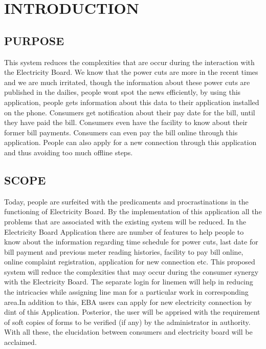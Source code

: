 \documentclass[12pt,a4paper,oneside]{report}
\begin{document}
\chapter{INTRODUCTION}
\label{intro}
\setcounter{page}{1}
\section{PURPOSE}
\par 
This system reduces the complexities that are occur during the interaction with the Electricity
Board. We know that the power cuts are more in the recent times and we are much
irritated, though the information about these power cuts are published in the dailies, people
wont spot the news efficiently, by using this application, people gets information about this
data to their application installed on the phone. Consumers get notification about their pay date
for the bill, until they have paid the bill. Consumers even have the facility to know about their
former bill payments. Consumers can even pay the bill online through this application. People
can also apply for a new connection through this application and thus avoiding too much offline
steps.

\section{SCOPE}
\par Today, people are surfeited with the predicaments and procrastinations in the functioning
of Electricity Board. By the implementation of this application all the problems that are
associated with the existing system will be reduced. In the Electricity Board Application there
are number of features to help people to know about the information regarding time schedule
for power cuts, last date for bill payment and previous meter reading histories, facility to pay
bill online, online complaint registration, application for new connection etc. This proposed system will reduce the complexities that may occur during the consumer synergy with the Electricity Board.
The separate login for linemen will help in reducing the intricacies while assigning line man for a particular work in corresponding area.In addition to this, EBA users can apply for new electricity connection by dint of this Application.
Posterior, the user will be apprised with the requirement of soft copies of forms to be verified (if any) by the administrator in authority. With all these, the elucidation between consumers and electricity board will be acclaimed. \\
\end{document}
